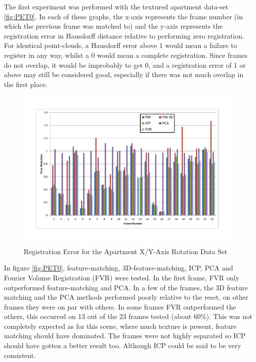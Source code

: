 The first experiment was performed with the textured apartment data-set \ref{fig:PET0}. In each of these graphs, the x-axis represents the frame number (in which the previous frame was matched to) and the y-axis represents the registration error in Hausdorff distance relative to performing zero registration. For identical point-clouds, a Hausdorff error above 1 would mean a failure to register in any way, whilst a 0 would mean a complete registration. Since frames do not overlap, it would be improbably to get 0, and a registration error of 1 or above may still be considered good, especially if there was not much overlap in the first place. \\


\begin{figure}[t]
\centering
\includegraphics[width=6.0in]{images/results/Apartment_Texture_Rotate_XAxis}
\caption{Registration Error for the Apartment X/Y-Axis Rotation Data Set}
\label{fig:PET1}
\end{figure}

In figure \ref{fig:PET0}, feature-matching, 3D-feature-matching, ICP, PCA and Fourier Volume Registration (FVR) were tested. In the first frame, FVR only outperformed feature-matching and PCA. In a few of the frames, the 3D feature matching and the PCA methods performed poorly relative to the reset, on other frames they were on par with others. In some frames FVR outperformed the others, this occurred on 13 out of the 23 frames tested (about 60\%). This was not completely expected as for this scene, where much texture is present, feature matching should have dominated. The frames were not highly separated so ICP should have gotten a better result too. Although ICP could be said to be very consistent.

